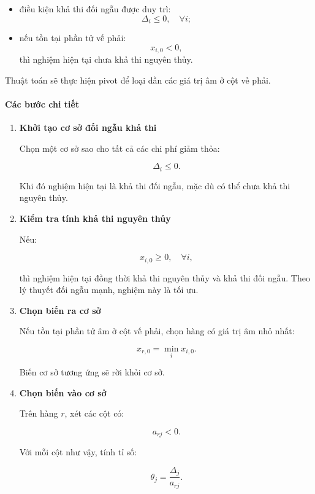 \documentclass[fontsize=13pt,a4paper]{report}
\begin{document}
\begin{itemize}
    \item điều kiện khả thi đối ngẫu được duy trì:
    \[
    \Delta_i \le 0,\quad \forall i;
    \]
    
    \item nếu tồn tại phần tử vế phải:
    \[
    x_{i,0}<0,
    \]
    thì nghiệm hiện tại chưa khả thi nguyên thủy.
\end{itemize}

Thuật toán sẽ thực hiện pivot để loại dần các giá trị âm ở cột vế phải.

\paragraph{Các bước chi tiết}

\begin{enumerate}

    \item \textbf{Khởi tạo cơ sở đối ngẫu khả thi}

    Chọn một cơ sở sao cho tất cả các chi phí giảm thỏa:

    \[
    \Delta_i \le 0.
    \]

    Khi đó nghiệm hiện tại là khả thi đối ngẫu, mặc dù có thể chưa khả thi nguyên thủy.

    \item \textbf{Kiểm tra tính khả thi nguyên thủy}

    Nếu:

    \[
    x_{i,0}\ge0,\quad \forall i,
    \]

    thì nghiệm hiện tại đồng thời khả thi nguyên thủy và khả thi đối ngẫu. Theo lý thuyết đối ngẫu mạnh, nghiệm này là tối ưu.

    \item \textbf{Chọn biến ra cơ sở}

    Nếu tồn tại phần tử âm ở cột vế phải, chọn hàng có giá trị âm nhỏ nhất:

    \[
    x_{r,0}=\min_i x_{i,0}.
    \]

    Biến cơ sở tương ứng sẽ rời khỏi cơ sở.

    \item \textbf{Chọn biến vào cơ sở}

    Trên hàng \(r\), xét các cột có:

    \[
    a_{rj}<0.
    \]

    Với mỗi cột như vậy, tính tỉ số:

    \[
    \theta_j=
    \frac{\Delta_j}{a_{rj}}.
    \]


\end{enumerate}
\end{document}
